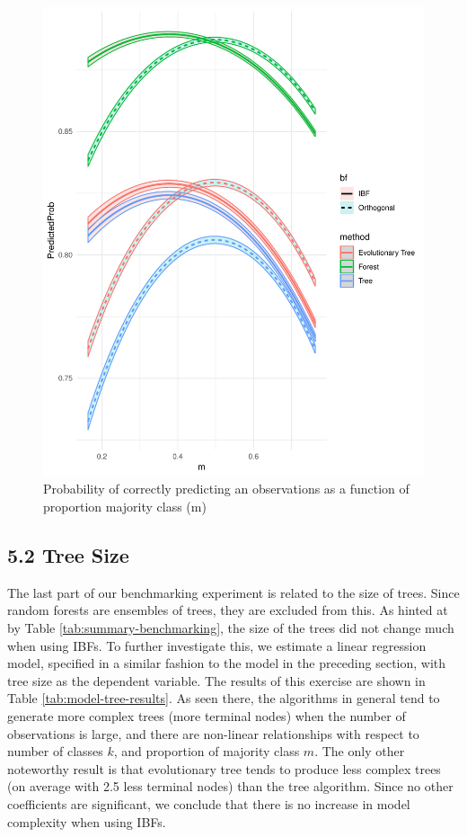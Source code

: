 \documentclass[]{elsarticle} %
\makeatletter
\def\maxwidth{\ifdim\Gin@nat@width>\linewidth\linewidth
\else\Gin@nat@width\fi}
\let\Oldincludegraphics\includegraphics
\renewcommand{\includegraphics}[1]{\Oldincludegraphics[width=\maxwidth]{#1}}
\makeatother
\begin{document}
\begin{figure}[htbp]
\centering
\includegraphics{Trees_with_Base_Functions_v2_files/figure-latex/fig15-estimated-accuracy-m-1.pdf}
\caption{\label{fig:fig15-estimated-accuracy-m}Probability of correctly
predicting an observations as a function of proportion majority class
(m)}
\end{figure}

\subsection{5.2 Tree Size}\label{tree-size}

The last part of our benchmarking experiment is related to the size of
trees. Since random forests are ensembles of trees, they are excluded
from this. As hinted at by Table \ref{tab:summary-benchmarking}, the
size of the trees did not change much when using IBFs. To further
investigate this, we estimate a linear regression model, specified in a
similar fashion to the model in the preceding section, with tree size as
the dependent variable. The results of this exercise are shown in Table
\ref{tab:model-tree-results}. As seen there, the algorithms in general
tend to generate more complex trees (more terminal nodes) when the
number of observations is large, and there are non-linear relationships
with respect to number of classes \(k\), and proportion of majority
class \(m\). The only other noteworthy result is that evolutionary tree
tends to produce less complex trees (on average with 2.5 less terminal
nodes) than the tree algorithm. Since no other coefficients are
significant, we conclude that there is no increase in model complexity
when using IBFs.
\end{document}
